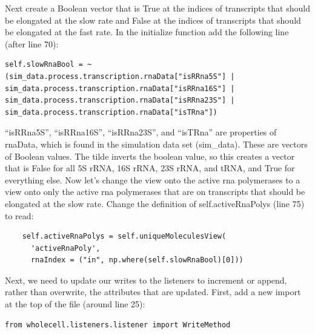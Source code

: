 \documentclass[12pt]{article}
\begin{document}
Next create a Boolean vector that is True at the indices of transcripts that should be elongated at the slow rate and False at the indices of transcripts that should be elongated at the fast rate. In the initialize function add the following line (after line 70):

\lstset{language=Python}
\begin{lstlisting}
self.slowRnaBool = ~(sim_data.process.transcription.rnaData["isRRna5S"] | sim_data.process.transcription.rnaData["isRRna16S"] | sim_data.process.transcription.rnaData["isRRna23S"] | sim_data.process.transcription.rnaData["isTRna"])
\end{lstlisting}

“isRRna5S”, “isRRna16S”, “isRRna23S”, and “isTRna” are properties of rnaData, which is found in the simulation data set (sim_data). These are vectors of Boolean values. The tilde inverts the boolean value, so this creates a vector that is False for all 5S rRNA, 16S rRNA, 23S rRNA, and tRNA, and True for everything else.
Now let’s change the view onto the active rna polymerases to a view onto only the active rna polymerases that are on transcripts that should be elongated at the slow rate. Change the definition of self.activeRnaPolys (line 75) to read:

\begin{lstlisting}
    self.activeRnaPolys = self.uniqueMoleculesView(
      'activeRnaPoly',
      rnaIndex = ("in", np.where(self.slowRnaBool)[0]))
\end{lstlisting}

Next, we need to update our writes to the listeners to increment or append, rather than overwrite, the attributes that are updated. First, add a new import at the top of the file (around line 25):
\begin{lstlisting}
from wholecell.listeners.listener import WriteMethod
\end{lstlisting}
\end{document}
